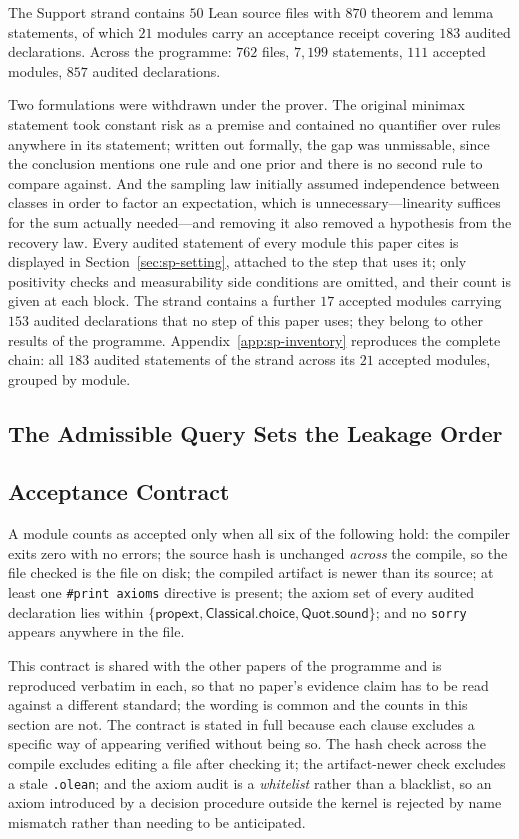 The Support strand contains $50$ Lean source files with $870$ theorem and lemma statements,
of which $21$ modules carry an acceptance receipt covering $183$ audited declarations. Across
the programme: $762$ files, $7{,}199$ statements, $111$ accepted modules, $857$ audited
declarations.

Two formulations were withdrawn under the prover. The original minimax statement took constant
risk as a premise and contained no quantifier over rules anywhere in its statement; written out
formally, the gap was unmissable, since the conclusion mentions one rule and one prior and
there is no second rule to compare against. And the sampling law initially assumed independence
between classes in order to factor an expectation, which is unnecessary---linearity suffices
for the sum actually needed---and removing it also removed a hypothesis from the recovery law.
Every audited statement of every module this paper cites is displayed in Section~\ref{sec:sp-setting}, attached to the step that uses it; only positivity checks and measurability side conditions are omitted, and their count is given at each block. The strand contains a further $17$ accepted modules carrying $153$ audited declarations that no step of this paper uses; they belong to other results of the programme. Appendix~\ref{app:sp-inventory} reproduces the complete chain: all $183$ audited statements of the strand across its $21$ accepted modules, grouped by module.


\subsection{The Admissible Query Sets the Leakage Order}
\label{sec:qy-verification}

\subsection{Acceptance Contract}

A module counts as accepted only when all six of the following hold: the compiler exits zero
with no errors; the source hash is unchanged \emph{across} the compile, so the file checked is
the file on disk; the compiled artifact is newer than its source; at least one
\texttt{\#print axioms} directive is present; the axiom set of every audited declaration lies
within $\{\textsf{propext},\textsf{Classical.choice},\textsf{Quot.sound}\}$; and no
\texttt{sorry} appears anywhere in the file.

This contract is shared with the other papers of the programme and is reproduced verbatim in
each, so that no paper's evidence claim has to be read against a different standard; the
wording is common and the counts in this section are not. The contract is stated in full
because each clause excludes a specific way of appearing verified without being so. The hash check across the compile excludes editing a file after
checking it; the artifact-newer check excludes a stale \texttt{.olean}; and the axiom audit is
a \emph{whitelist} rather than a blacklist, so an axiom introduced by a decision procedure
outside the kernel is rejected by name mismatch rather than needing to be anticipated.

